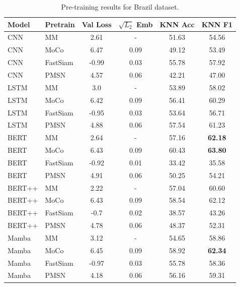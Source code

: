 \begin{table}[ht!]
    \centering
    \caption{Pre-training results for Brazil dataset.}
    \begin{tabular}{llcccc}
        \toprule
        Model & Pretrain & Val Loss & $\sqrt{L_2}$ Emb & KNN Acc & KNN F1 \\
        \midrule
        CNN & MM & 2.61 & - & 51.63 & 54.56 \\
        CNN & MoCo & 6.47 & 0.09 & 49.12 & 53.49 \\
        CNN & FastSiam & -0.99 & 0.03 & 55.78 & 57.92 \\
        CNN & PMSN & 4.57 & 0.06 & 42.21 & 47.00 \\
        LSTM & MM & 3.0 & - & 53.89 & 58.02 \\
        LSTM & MoCo & 6.42 & 0.09 & 56.41 & 60.29 \\
        LSTM & FastSiam & -0.95 & 0.03 & 53.64 & 56.71 \\
        LSTM & PMSN & 4.88 & 0.06 & 57.54 & 61.23 \\
        BERT & MM & 2.64 & - & 57.16 & \textbf{62.18} \\
        BERT & MoCo & 6.43 & 0.09 & 60.43 & \textbf{63.80} \\
        BERT & FastSiam & -0.92 & 0.01 & 33.42 & 35.58 \\
        BERT & PMSN & 4.91 & 0.06 & 50.25 & 54.21 \\
        BERT++ & MM & 2.22 & - & 57.04 & 60.60 \\
        BERT++ & MoCo & 6.43 & 0.09 & 58.54 & 62.12 \\
        BERT++ & FastSiam & -0.7 & 0.02 & 38.57 & 43.26 \\
        BERT++ & PMSN & 4.78 & 0.06 & 48.37 & 52.31 \\
        Mamba & MM & 3.12 & - & 54.65 & 58.86 \\
        Mamba & MoCo & 6.45 & 0.09 & 58.92 & \textbf{62.34} \\
        \rowcolor{red!20} Mamba & FastSiam & -0.97 & 0.03 & 55.78 & 58.36 \\
        Mamba & PMSN & 4.18 & 0.06 & 56.16 & 59.31 \\
        \bottomrule
    \end{tabular}
    \label{tab:pretraining_results_brazil}
\end{table}

